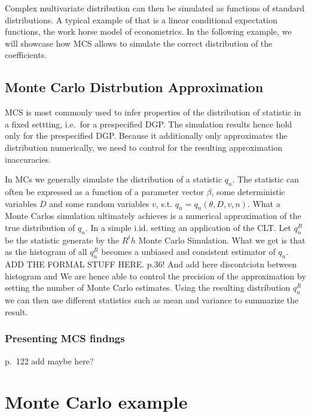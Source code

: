 \documentclass[10pt,a4paper]{article}
\begin{document}
 Complex multivariate distribution can then be simulated as functions of
 standard distributions. A typical example of that is a linear
 conditional expectation functions, the work horse model of
 econometrics. In the following example, we will showcase how MCS allows
 to simulate the correct distribution of the coefficients.

 \hypertarget{monte-carlo-distrbution-approximation}{%
 \subsection{Monte Carlo Distrbution
 Approximation}\label{monte-carlo-distrbution-approximation}}

 MCS is most commonly used to infer properties of the distribution of
 statistic in a fixed settting, i.e.~for a prespecified DGP. The
 simulation results hence hold only for the prespecified DGP. Because it
 additionally only approximates the distribution numerically, we need to
 control for the resulting approximation inaccuracies.

 In MCs we generally simulate the distribution of a statistic \(q_n\).
 The statistic can often be expressed as a function of a parameter
 vector \(\beta\), some deterministic variables \(D\) and some random
 variables \(v\), s.t. \(q_n = q_n(\theta,D,v,n)\). What a Monte Carlos
 simulation ultimately achieves is a numerical approximation of the true
 distribution of \(q_n\). In a simple i.id. setting an application of
 the CLT. Let \(q_n^R\) be the statistic generate by the \(R^th\) Monte
 Carlo Simulation. What we get is that as the histogram of all \(q_n^R\)
 becomes a unbiased and consistent estimator of \(q_n\). ADD THE FORMAL
 STUFF HERE. p.36! And add here discontciotn between histogram and We
 are hence able to control the precision of the approximation by setting
 the number of Monte Carlo estimates. Using the resulting distribution
 \(q_n^R\) we can then use different statistics such as mean and
 variance to summarize the result.

 \hypertarget{presenting-mcs-findngs}{%
 \subsubsection{Presenting MCS findngs}\label{presenting-mcs-findngs}}

 p.~122 add maybe here?

 \hypertarget{monte-carlo-example}{%
 \section{Monte Carlo example}\label{monte-carlo-example}}
\end{document}
